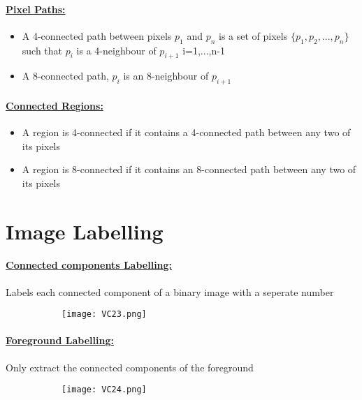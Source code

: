 \documentclass[8pt]{extreport}
\begin{document}
\paragraph{\underline{Pixel Paths:}}
\begin{itemize}
\item A 4-connected path between pixels $p_1$ and $p_n$ is a set of pixels $\{p_1,p_2,...,p_n\}$ such that $p_i$ is a 4-neighbour of $p_{i+1}$ i=1,...,n-1
\item A  8-connected path, $p_i$ is an 8-neighbour of $p_{i+1}$
\end{itemize}

\paragraph{\underline{Connected Regions:}}
\begin{itemize}
\item A region is 4-connected if it contains a 4-connected path between any two of its pixels
\item A region is 8-connected if it contains an 8-connected path between any two of its pixels
\end{itemize}

\section{Image Labelling}

\paragraph{\underline{Connected components Labelling:}} Labels each connected component of a binary image with a seperate number
\begin{figure}[H]
\centering
\begin{subfigure}[b]{0.5\linewidth}
\texttt{[image: VC23.png]}
\end{subfigure}
\end{figure}

\paragraph{\underline{Foreground Labelling:}} Only extract the connected components of the foreground
\begin{figure}[H]
\centering
\begin{subfigure}[b]{0.5\linewidth}
\texttt{[image: VC24.png]}
\end{subfigure}
\end{figure}
\end{document}

